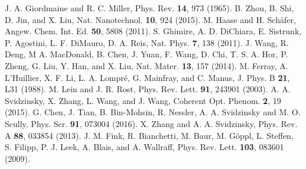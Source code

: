 \documentclass[aps,prl,nobibnotes,nofootinbib,showpacs,reprint]{revtex4-1}
\begin{document}
\begin{thebibliography}{99}
	 J. A. Giordmaine and R. C. Miller, Phys. Rev. \textbf{14}, 973 (1965). %
	 B. Zhou, B. Shi, D. Jin, and X. Liu, Nat. Nanotechnol. \textbf{10}, 924 (2015). %
	 M. Haase and H. Sch\"{a}fer, Angew. Chem. Int. Ed. \textbf{50}, 5808 (2011). %
	 S. Ghimire, A. D. DiChiara, E. Sistrunk, P. Agostini, L. F. DiMauro, D. A. Reis, Nat. Phys. \textbf{7}, 138 (2011). %
	 J. Wang, R. Deng, M A. MacDonald, B. Chen, J. Yuan, F. Wang, D. Chi, T. S. A. Hor, P. Zheng, G. Liu, Y. Han, and X. Liu, Nat. Mater. \textbf{13}, 157 (2014). %
	 M. Ferray, A. L'Huillier, X. F. Li, L. A. Lompr\'{e}, G. Mainfray, and C. Manus, J. Phys. B \textbf{21}, L31 (1988). %
	 M. Lein and J. R. Rost, Phys. Rev. Lett. \textbf{91}, 243901 (2003). %
	 A. A. Svidzinsky, X. Zhang, L. Wang, and J. Wang, Coherent Opt. Phenom. \textbf{2}, 19 (2015). %
	 G. Chen, J. Tian, B. Bin-Mohsin, R. Nessler, A. A. Svidzinsky and M. O. Scully, Phys. Scr. \textbf{91}, 073004 (2016). %
	 X. Zhang and A. A. Svidzinsky, Phys. Rev. A \textbf{88}, 033854 (2013). %
	 J. M. Fink, R. Bianchetti, M. Baur, M. G\"{o}ppl, L. Steffen, S. Filipp, P. J. Leek, A. Blais, and A. Wallraff, Phys. Rev. Lett. \textbf{103}, 083601 (2009).
		
\end{thebibliography}
\end{document}
